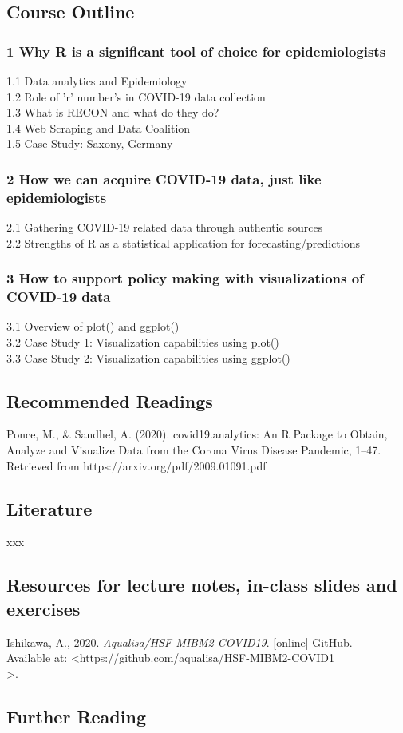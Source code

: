 \documentclass{article}
\begin{document}
\subsection*{Course Outline}
\begin{spacing}{1.0}
\subsubsection*{1 Why R is a significant tool of choice for epidemiologists}
    1.1 Data analytics and Epidemiology \\
    1.2 Role of 'r' number's in COVID-19 data collection \\
    1.3 What is RECON and what do they do? \\
    1.4 Web Scraping and Data Coalition \\
    1.5 Case Study: Saxony, Germany
\subsubsection*{2 How we can acquire COVID-19 data, just like epidemiologists}
    2.1 Gathering COVID-19 related data through authentic sources \\
    2.2 Strengths of R as a statistical application for forecasting/predictions
    \subsubsection*{3 How to support policy making with visualizations of COVID-19 data}
    3.1 Overview of plot() and ggplot() \\
    3.2 Case Study 1: Visualization capabilities using plot() \\
    3.3 Case Study 2: Visualization capabilities using ggplot()
\end{spacing}
\noindent 
\subsection*{Recommended Readings}

Ponce, M., & Sandhel, A. (2020). covid19.analytics: An R Package to Obtain, \indent Analyze and Visualize Data from the Corona Virus Disease Pandemic, 1–47. \indent Retrieved from https://arxiv.org/pdf/2009.01091.pdf

\noindent
\subsection*{Literature}
xxx

\subsection*{Resources for lecture notes, in-class slides and exercises}
Ishikawa, A., 2020. \textit{Aqualisa/HSF-MIBM2-COVID19}. [online] GitHub.  \\
\indent Available at: <https://github.com/aqualisa/HSF-MIBM2-COVID1  \\
>.  \\
\noindent

\subsection*{Further Reading}
\end{document}
